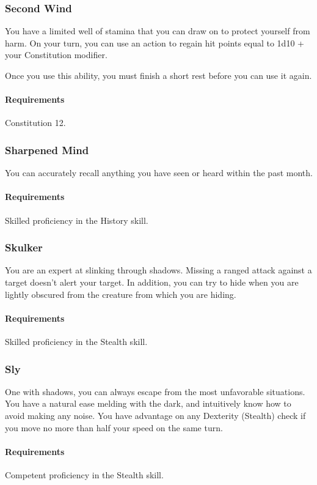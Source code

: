 \subsubsection{Second Wind} \label{feat::secondwind}
    You have a limited well of stamina that you can draw on to protect yourself from harm.
    On your turn, you can use an action to regain hit points equal to 1d10 + your Constitution modifier.

    Once you use this ability, you must finish a short rest before you can use it again.
    \paragraph{Requirements} Constitution 12.
\subsubsection{Sharpened Mind} \label{feat::sharpenedmind}
    You can accurately recall anything you have seen or heard within the past month.
    \paragraph{Requirements} Skilled proficiency in the History skill.
\subsubsection{Skulker} \label{feat::skulker}
    You are an expert at slinking through shadows.
    Missing a ranged attack against a target doesn't alert your target.
    In addition, you can try to hide when you are lightly obscured from the creature from which you are hiding.
    \paragraph{Requirements} Skilled proficiency in the Stealth skill.
\subsubsection{Sly} \label{feat::sly}
    One with shadows, you can always escape from the most unfavorable situations.
    You have a natural ease melding with the dark, and intuitively know how to avoid making any noise.
    You have advantage on any Dexterity (Stealth) check if you move no more than half your speed on the same turn.
    \paragraph{Requirements} Competent proficiency in the Stealth skill.
